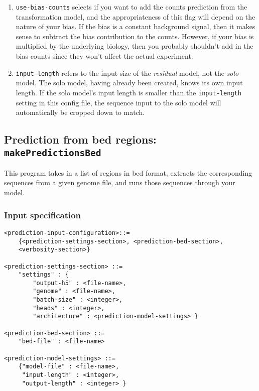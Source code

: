 \documentclass{article}
\begin{document}
\begin{enumerate}
    \item \texttt{use-bias-counts} selects if you want to add the counts prediction from the
        transformation model, and the appropriateness of this flag will depend on the nature
        of your bias.
        If the bias is a constant background signal, then it makes sense to subtract the bias
        contribution to the counts.
        However, if your bias is multiplied by the underlying biology, then you probably
        shouldn't add in the bias counts since they won't affect the actual experiment.
    \item \texttt{input-length} refers to the input size of the \emph{residual} model, not
        the \emph{solo} model.
        The solo model, having already been created, knows its own input length.
        If the solo model's input length is smaller than the \texttt{input-length} setting
        in this config file, the sequence input to the solo model will automatically
        be cropped down to match.
\end{enumerate}




\newpage

\subsection{Prediction from bed regions: \texttt{makePredictionsBed}}\label{prog:makePredictionsBed}

This program takes in a list of regions in bed format, extracts the corresponding sequences from
a given genome file, and runs those sequences through your model.


\subsubsection{Input specification}

\begin{lstlisting}
<prediction-input-configuration>::=
    {<prediction-settings-section>, <prediction-bed-section>,
    <verbosity-section>}

<prediction-settings-section> ::=
    "settings" : {
        "output-h5" : <file-name>,
        "genome" : <file-name>,
        "batch-size" : <integer>,
        "heads" : <integer>,
        "architecture" : <prediction-model-settings> }

<prediction-bed-section> ::=
    "bed-file" : <file-name>

<prediction-model-settings> ::=
    {"model-file" : <file-name>,
     "input-length" : <integer>,
     "output-length" : <integer> }
\end{lstlisting}
\end{document}
